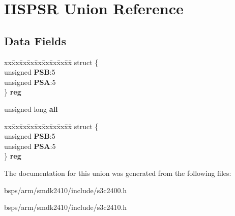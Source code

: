 \hypertarget{unionIISPSR}{}\section{I\+I\+S\+P\+SR Union Reference}
\label{unionIISPSR}
\subsection*{Data Fields}
\begin{DoxyCompactItemize}
\item 
\mbox{\label{unionIISPSR_ae196eef55930dbc30bc762f0a1ff9b10}} 
\begin{tabbing}
xx\=xx\=xx\=xx\=xx\=xx\=xx\=xx\=xx\=\kill
struct \{\\
\>unsigned {\bfseries PSB}:5\\
\>unsigned {\bfseries PSA}:5\\
\} {\bfseries reg}\\

\end{tabbing}\item 
\mbox{\label{unionIISPSR_ae0bd765e7115fca763ae08fb8941d042}} 
unsigned long {\bfseries all}
\item 
\mbox{\label{unionIISPSR_ae71c099339075e845d08b9af2fecd299}} 
\begin{tabbing}
xx\=xx\=xx\=xx\=xx\=xx\=xx\=xx\=xx\=\kill
struct \{\\
\>unsigned {\bfseries PSB}:5\\
\>unsigned {\bfseries PSA}:5\\
\} {\bfseries reg}\\

\end{tabbing}\end{DoxyCompactItemize}


The documentation for this union was generated from the following files\+:\begin{DoxyCompactItemize}
\item 
bsps/arm/smdk2410/include/s3c2400.\+h\item 
bsps/arm/smdk2410/include/s3c2410.\+h\end{DoxyCompactItemize}
